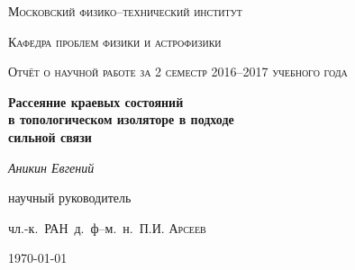 \begin{titlepage}
	\centering
	{\scshape\LARGE Московский физико--технический институт\par}
	{\scshape Кафедра проблем физики и астрофизики \par}
	\vspace{1cm}
	{\scshape\Large Отчёт о научной работе за 2 семестр 2016--2017 учебного года\par}
	\vspace{1.5cm}
	{\huge\bfseries Рассеяние краевых состояний \\в топологическом изоляторе 
        в подходе\\ сильной связи
		\par}
	\vspace{2cm}
	{\Large\itshape Аникин Евгений\par}
	\vfill
	научный руководитель\par
	чл.-к.~РАН~д.~ф--м.~н.~П.И. \textsc{Арсеев}

	\vfill

	{\large \today\par}
\end{titlepage}
